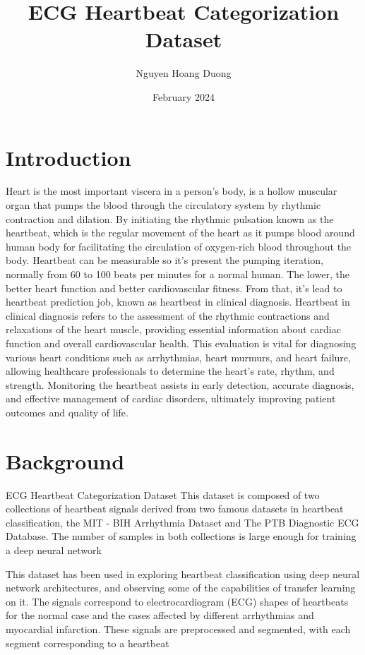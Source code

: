 \documentclass[twocolumn]{article}
\title{ECG Heartbeat Categorization Dataset}
\author{Nguyen Hoang Duong}
\date{February 2024}
\begin{document}
\maketitle

\section{Introduction}
Heart is the most important viscera in a person's body, is a hollow muscular organ that pumps the blood through the circulatory system by rhythmic contraction and dilation. By initiating the rhythmic pulsation known as the heartbeat, which is the regular movement of the heart as it pumps blood around human body for facilitating the circulation of oxygen-rich blood throughout the body. Heartbeat can be measurable so it's present the pumping iteration, normally from 60 to 100 beats per minutes for a normal human. The lower, the better heart function and better cardiovascular fitness. From that, it's lead to heartbeat prediction job, known as heartbeat in clinical diagnosis. Heartbeat in clinical diagnosis refers to the assessment of the rhythmic contractions and relaxations of the heart muscle, providing essential information about cardiac function and overall cardiovascular health. 
This evaluation is vital for diagnosing various heart conditions such as arrhythmias, heart murmurs, and heart failure, allowing healthcare professionals to determine the heart's rate, rhythm, and strength. Monitoring the heartbeat assists in early detection, accurate diagnosis, and effective management of cardiac disorders, ultimately improving patient outcomes and quality of life.
\section{Background}
ECG Heartbeat Categorization Dataset
This dataset is composed of two collections of heartbeat signals derived from two famous datasets in heartbeat classification, the MIT - BIH Arrhythmia Dataset and The PTB Diagnostic ECG Database. The number of samples in both collections is large enough for training a deep neural network

This dataset has been used in exploring heartbeat classification using deep neural network architectures, and observing some of the capabilities of transfer learning on it. The signals correspond to electrocardiogram (ECG) shapes of heartbeats for the normal case and the cases affected by different arrhythmias and myocardial infarction. These signals are preprocessed and segmented, with each segment corresponding to a heartbeat
\end{document}
